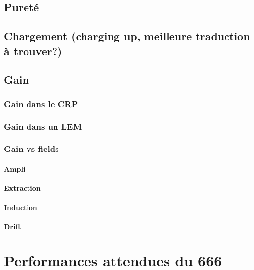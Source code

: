     \subsection{Pureté}
    \subsection{Chargement (charging up, meilleure traduction à trouver?)}
    \subsection{Gain}
      \subsubsection{Gain dans le CRP}
      \subsubsection{Gain dans un LEM}
      \subsubsection{Gain vs fields}
        \paragraph{Ampli}
        \paragraph{Extraction}
        \paragraph{Induction}
        \paragraph{Drift}
    
    \section{Performances attendues du 666}

\FloatBarrier

\printbibliography